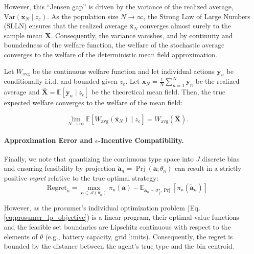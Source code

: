 \documentclass[12pt, notitlepage]{article}
\begin{document}
However, this ``Jensen gap'' is driven by the variance of the realized average, $\mathrm{Var}(\bar{\mathbf{x}}_N \mid z_e)$. As the population size $N \to \infty$, the Strong Law of Large Numbers (SLLN) ensures that the realized average $\bar{\mathbf{x}}_N$ converges almost surely to the sample mean  $\bar{\mathbf{X}}$. Consequently, the variance vanishes, and by continuity and boundedness of the welfare function, the welfare of the stochastic average converges to the welfare of the deterministic mean field approximation.

\begin{proposition} \label{prop:mfg-welfare}

Let $W_{\text{avg}}$ be the continuous welfare function and let individual actions $\mathbf{y}_n$ be conditionally i.i.d. and bounded given $z_e$. Let $\bar{\mathbf{x}}_N = \frac{1}{N}\sum_{n=1}^N \mathbf{y}_n$ be the realized average and $\bar{\mathbf{X}} = \mathbb{E}[\mathbf{y}_n \mid z_e]$ be the theoretical mean field. Then, the true expected welfare converges to the welfare of the mean field:

$$\lim_{N\to\infty} \mathbb{E}\left[W_{\text{avg}}(\bar{\mathbf{x}}_N) \mid z_e\right] = W_{\text{avg}}(\bar{\mathbf{X}}).$$

\end{proposition}



\paragraph{Approximation Error and $\epsilon$-Incentive Compatibility.}
Finally, we note that quantizing the continuous type space into $J$ discrete bins and ensuring feasibility by projection $\widetilde{\mathbf{a}}_n = \operatorname{Prj}(\mathbf{a}; \theta_n)$ can result in a strictly positive \textit{regret} relative to the true optimal strategy:
$$ 
\text{Regret}_n = \max_{\mathbf{a} \in \mathcal{A}(\theta_n)} \pi_n(\mathbf{a}) - \mathbb{E}_{\widetilde{\mathbf{a}}_n \sim \sigma_j^\star, \operatorname{Prj}} \left[ \pi_n(\widetilde{\mathbf{a}}_n) \right]$$

However, as the prosumer's individual optimization problem (Eq. \ref{eq:prosumer_lp_objective}) is a linear program, their optimal value functions and the feasible set boundaries are Lipschitz continuous with respect to the elements of $\theta$ (e.g., battery capacity, grid limits). Consequently, the regret is bounded by the distance between the agent's true type and the bin centroid. 
\end{document}

